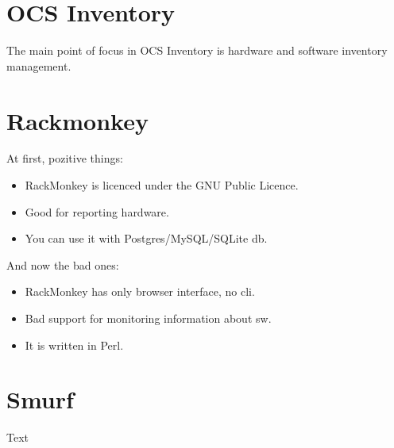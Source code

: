 \documentclass[12pt]{article}
\begin{document}
\section{OCS Inventory}
The main point of focus in OCS Inventory is hardware and software inventory management.



\section{Rackmonkey}
At first, pozitive things:
\begin{itemize}
\item RackMonkey is licenced under the GNU Public Licence.
\item Good for reporting hardware.
\item You can use it with Postgres/MySQL/SQLite db.
\end{itemize}


And now the bad ones:
\begin{itemize}
\item RackMonkey has only browser interface, no cli.
\item Bad support for monitoring information about sw.
\item It is written in Perl.
\end{itemize}



\section{Smurf}
Text
\end{document}
